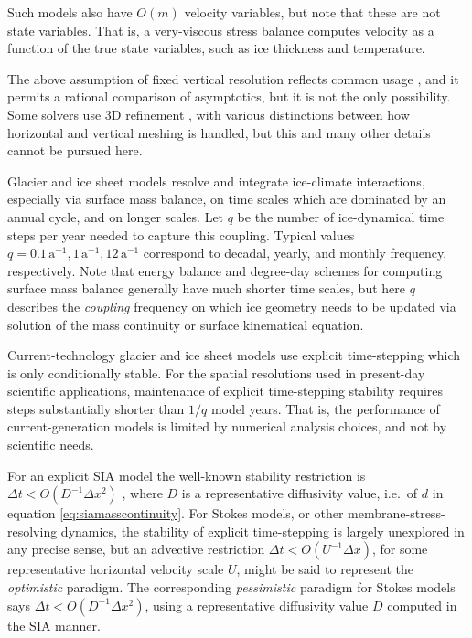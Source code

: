 \documentclass[review,letterpaper]{igs}
\begin{document}
Such models also have $O(m)$ velocity variables, but note that these are not state variables.  That is, a very-viscous stress balance computes velocity as a function of the true state variables, such as ice thickness and temperature.

The above assumption of fixed vertical resolution reflects common usage \citep[for example]{Aschwandenetal2019,BrinkerhoffJohnson2015,Hoffmanetal2018,Lengetal2012,
Winkelmannetal2011}, and it permits a rational comparison of asymptotics, but it is not the only possibility.  Some solvers use 3D refinement \citep{BrownSmithAhmadia2013,IsaacStadlerGhattas2015,Tuminaroetal2016}, with various distinctions between how horizontal and vertical meshing is handled, but this and many other details cannot be pursued here.

Glacier and ice sheet models resolve and integrate ice-climate interactions, especially via surface mass balance, on time scales which are dominated by an annual cycle, and on longer scales.  Let $q$ be the number of ice-dynamical time steps per year needed to capture this coupling.  Typical values $q=0.1 \,\text{a}^{-1}, 1 \,\text{a}^{-1}, 12 \,\text{a}^{-1}$ correspond to decadal, yearly, and monthly frequency, respectively.  Note that energy balance and degree-day schemes for computing surface mass balance \citep{GreveBlatter2009} generally have much shorter time scales, but here $q$ describes the \emph{coupling} frequency on which ice geometry needs to be updated via solution of the mass continuity or surface kinematical equation.

Current-technology glacier and ice sheet models use explicit time-stepping which is only conditionally stable.  For the spatial resolutions used in present-day scientific applications, maintenance of explicit time-stepping stability requires steps substantially shorter than $1/q$ model years.  That is, the performance of current-generation models is limited by numerical analysis choices, and not by scientific needs.

For an explicit SIA model the well-known stability restriction is $\Delta t < O(D^{-1} \Delta x^2)$ \citep{Bueleretal2005,HindmarshPayne1996}, where $D$ is a representative diffusivity value, i.e.~of $d$ in equation \eqref{eq:siamasscontinuity}.  For Stokes models, or other membrane-stress-resolving dynamics, the stability of explicit time-stepping is largely unexplored in any precise sense, but an advective restriction $\Delta t < O(U^{-1} \Delta x)$, for some representative horizontal velocity scale $U$, might be said to represent the \emph{optimistic} paradigm.  The corresponding \emph{pessimistic} paradigm for Stokes models says $\Delta t < O(D^{-1} \Delta x^2)$, using a representative diffusivity value $D$ computed in the SIA manner.
\end{document}

